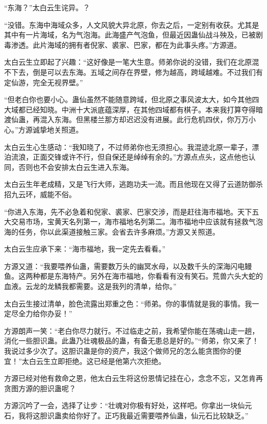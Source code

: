 
\begin{this_body}



“东海？”太白云生诧异。？

“没错。东海中海域众多，人文风貌大异北原，你去之后，一定别有收获。尤其是其中有一片海域，名为气泡海。此海盛产气泡鱼，但最近因蛊仙战斗殃及，已被剧毒渗透。此片海域的拥有者倪家、裘家、巴家，都在为此事头疼。”方源道。

太白云生立即起了兴趣：“这好像是一笔大生意。师弟你说的没错，我们在北原混不下去，倒是可以去东海。五域之间存在界壁，修为越高，跨域越难。不过我们有定仙游，完全无视界壁。”

“但老白你也要小心。蛊仙虽然不能随意跨域，但北原之事风波太大，如今其他四大域都已经知晓。中洲十大派底蕴深厚，在其他四域都有棋子。本来我打算夺得暗渡仙蛊，再混入东海。但黑楼兰那方却迟迟没有进展。此行危机四伏，你万万小心。”方源诚挚地关照道。

太白云生心生感动：“我知晓了，不过师弟你也无须担心。我混迹北原一辈子，漂泊流浪，正面交锋或许不行，但自保还是绰绰有余的。”方源点点头，这点他也认同，否则也不会安排太白云生进入东海。

太白云生年老成精，又是飞行大师，逃跑功夫一流。而且他现在又得了云道防御杀招九云环，威能不俗。

“你进入东海，先不必急着和倪家、裘家、巴家交涉，而是赶往海市福地。天下五大交易市场，宝黄天名列第一，海市福地名列第二。海市福地中应该就有拯救气泡海的任务，你以此渠道接触三家。会省去许多麻烦。”方源又关照道。

太白云生应承下来：“海市福地，我一定先去看看。”

方源又道：“我要喂养仙蛊，需要数万头的幽冥水母，以及数千头的深海闪电鳗鱼。这两种都是东海特产。另外在海市福地，你看看有没有笑石。荒兽六头大蛇的血液。云龙的龙鳞我都需要。这是我列的清单，给你。”

太白云生接过清单，脸色流露出郑重之色：“师弟。你的事情就是我的事情。我一定尽全力给你办妥！”

方源朗声一笑：“老白你尽力就行。不过临走之前，我希望你能在荡魂山走一趟，消化一些胆识蛊。此蛊乃壮魂极品的蛊，有备无患总是好的。”“师弟，你又来了！我说过多少次了。这胆识蛊是你的资产，我这个做师兄的怎么能贪图你的便宜！”太白云生立即拒绝。这已经是他第六次拒绝。

方源已经对他有救命之恩，他太白云生将这份恩情记挂在心，念念不忘，又怎肯再贪图方源的胆识蛊呢？

方源沉吟了一会，选择了让步：“壮魂对你极有好处，这样吧。你拿出一块仙元石，我将这胆识蛊卖给你好了。正巧我最近需要喂养仙蛊，仙元石比较缺乏。”


\end{this_body}
